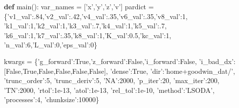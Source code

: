 \documentclass[english,a4paper,oneside]{article}
\newenvironment{Shaded}{}{}
\newcommand{\KeywordTok}[1]{\textcolor[rgb]{0.00,0.44,0.13}{\textbf{#1}}}
\newcommand{\DecValTok}[1]{\textcolor[rgb]{0.25,0.63,0.44}{#1}}
\newcommand{\FloatTok}[1]{\textcolor[rgb]{0.25,0.63,0.44}{#1}}
\newcommand{\StringTok}[1]{\textcolor[rgb]{0.25,0.44,0.63}{#1}}
\newcommand{\VariableTok}[1]{\textcolor[rgb]{0.10,0.09,0.49}{#1}}
\newcommand{\OperatorTok}[1]{\textcolor[rgb]{0.40,0.40,0.40}{#1}}
\newcommand{\NormalTok}[1]{#1}
\begin{document}
\begin{Shaded}
\begin{Highlighting}[]
\KeywordTok{def}\NormalTok{ main():}
\NormalTok{    var_names }\OperatorTok{=}\NormalTok{ [}\StringTok{'x'}\NormalTok{,}\StringTok{'y'}\NormalTok{,}\StringTok{'z'}\NormalTok{,}\StringTok{'v'}\NormalTok{]}
\NormalTok{    pardict }\OperatorTok{=}\NormalTok{ \{}\StringTok{'v1_val'}\NormalTok{:.}\DecValTok{84}\NormalTok{,}\StringTok{'v2_val'}\NormalTok{:.}\DecValTok{42}\NormalTok{,}\StringTok{'v4_val'}\NormalTok{:.}\DecValTok{35}\NormalTok{,}\StringTok{'v6_val'}\NormalTok{:.}\DecValTok{35}\NormalTok{,}\StringTok{'v8_val'}\NormalTok{:}\DecValTok{1}\NormalTok{,}
               \StringTok{'k1_val'}\NormalTok{:}\DecValTok{1}\NormalTok{,}\StringTok{'k2_val'}\NormalTok{:}\DecValTok{1}\NormalTok{,}\StringTok{'k3_val'}\NormalTok{:.}\DecValTok{7}\NormalTok{,}\StringTok{'k4_val'}\NormalTok{:}\DecValTok{1}\NormalTok{,}\StringTok{'k5_val'}\NormalTok{:.}\DecValTok{7}\NormalTok{,}
               \StringTok{'k6_val'}\NormalTok{:}\DecValTok{1}\NormalTok{,}\StringTok{'k7_val'}\NormalTok{:.}\DecValTok{35}\NormalTok{,}\StringTok{'k8_val'}\NormalTok{:}\DecValTok{1}\NormalTok{,}\StringTok{'K_val'}\NormalTok{:}\FloatTok{0.5}\NormalTok{,}\StringTok{'kc_val'}\NormalTok{:}\DecValTok{1}\NormalTok{,}
               \StringTok{'n_val'}\NormalTok{:}\DecValTok{6}\NormalTok{,}\StringTok{'L_val'}\NormalTok{:}\DecValTok{0}\NormalTok{,}\StringTok{'eps_val'}\NormalTok{:}\DecValTok{0}\NormalTok{\}}
    
\NormalTok{    kwargs }\OperatorTok{=}\NormalTok{ \{}\StringTok{'g_forward'}\NormalTok{:}\VariableTok{True}\NormalTok{,}\StringTok{'z_forward'}\NormalTok{:}\VariableTok{False}\NormalTok{,}\StringTok{'i_forward'}\NormalTok{:}\VariableTok{False}\NormalTok{,}
              \StringTok{'i_bad_dx'}\NormalTok{:[}\VariableTok{False}\NormalTok{,}\VariableTok{True}\NormalTok{,}\VariableTok{False}\NormalTok{,}\VariableTok{False}\NormalTok{,}\VariableTok{False}\NormalTok{,}\VariableTok{False}\NormalTok{],}
              \StringTok{'dense'}\NormalTok{:}\VariableTok{True}\NormalTok{,}
              \StringTok{'dir'}\NormalTok{:}\StringTok{'home+goodwin_dat/'}\NormalTok{,}
              \StringTok{'trunc_order'}\NormalTok{:}\DecValTok{5}\NormalTok{,}
              \StringTok{'trunc_deriv'}\NormalTok{:}\DecValTok{5}\NormalTok{,}
              \StringTok{'NA'}\NormalTok{:}\DecValTok{2000}\NormalTok{,}
              \StringTok{'p_iter'}\NormalTok{:}\DecValTok{20}\NormalTok{,}
              \StringTok{'max_iter'}\NormalTok{:}\DecValTok{200}\NormalTok{,}
              \StringTok{'TN'}\NormalTok{:}\DecValTok{2000}\NormalTok{,}
              \StringTok{'rtol'}\NormalTok{:}\FloatTok{1e-13}\NormalTok{,}
              \StringTok{'atol'}\NormalTok{:}\FloatTok{1e-13}\NormalTok{,}
              \StringTok{'rel_tol'}\NormalTok{:}\FloatTok{1e-10}\NormalTok{,}
              \StringTok{'method'}\NormalTok{:}\StringTok{'LSODA'}\NormalTok{,}
              \StringTok{'processes'}\NormalTok{:}\DecValTok{4}\NormalTok{,}
              \StringTok{'chunksize'}\NormalTok{:}\DecValTok{10000}\NormalTok{\}}
              

\end{Highlighting}
\end{Shaded}
\end{document}
